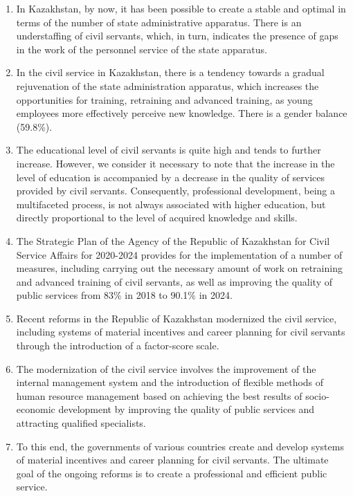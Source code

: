 \begin{enumerate}
\item
In Kazakhstan, by now, it has been possible to create a stable and
optimal in terms of the number of state administrative apparatus. There
is an understaffing of civil servants, which, in turn, indicates the
presence of gaps in the work of the personnel service of the state
apparatus.

\item
In the civil service in Kazakhstan, there is a tendency towards a
gradual rejuvenation of the state administration apparatus, which
increases the opportunities for training, retraining and advanced
training, as young employees more effectively perceive new knowledge.
There is a gender balance (59.8\%).

\item
The educational level of civil servants is quite high and tends to
further increase. However, we consider it necessary to note that the
increase in the level of education is accompanied by a decrease in the
quality of services provided by civil servants. Consequently,
professional development, being a multifaceted process, is not always
associated with higher education, but directly proportional to the level
of acquired knowledge and skills.

\item
The Strategic Plan of the Agency of the Republic of Kazakhstan for
Civil Service Affairs for 2020-2024 provides for the implementation of a
number of measures, including carrying out the necessary amount of work
on retraining and advanced training of civil servants, as well as
improving the quality of public services from 83\% in 2018 to 90.1\% in
2024.

\item
Recent reforms in the Republic of Kazakhstan modernized the civil
service, including systems of material incentives and career planning
for civil servants through the introduction of a factor-score scale.

\item
The modernization of the civil service involves the improvement of
the internal management system and the introduction of flexible methods
of human resource management based on achieving the best results of
socio-economic development by improving the quality of public services
and attracting qualified specialists.

\item
To this end, the governments of various countries create and develop
systems of material incentives and career planning for civil servants.
The ultimate goal of the ongoing reforms is to create a professional and
efficient public service.


\end{enumerate}
